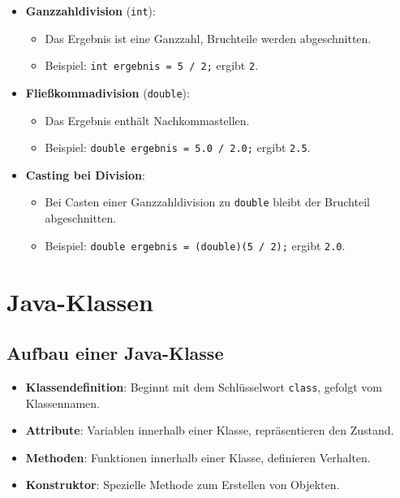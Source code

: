 \documentclass[a4paper,10pt, dvipsnames]{report}
\newcommand{\javaInLine}[1]{\texttt{#1}}
\begin{document}
\begin{itemize}
    \item \textbf{Ganzzahldivision} (\javaInLine{int}):
    \begin{itemize}
        \item Das Ergebnis ist eine Ganzzahl, Bruchteile werden abgeschnitten.
        \item Beispiel: \javaInLine{int ergebnis = 5 / 2;} ergibt \javaInLine{2}.
    \end{itemize}

    \item \textbf{Fließkommadivision} (\javaInLine{double}):
    \begin{itemize}
        \item Das Ergebnis enthält Nachkommastellen.
        \item Beispiel: \javaInLine{double ergebnis = 5.0 / 2.0;} ergibt \javaInLine{2.5}.
    \end{itemize}

    \item \textbf{Casting bei Division}:
    \begin{itemize}
        \item Bei Casten einer Ganzzahldivision zu \javaInLine{double} bleibt der Bruchteil abgeschnitten.
        \item Beispiel: \javaInLine{double ergebnis = (double)(5 / 2);} ergibt \javaInLine{2.0}.
    \end{itemize}
\end{itemize}




\section{Java-Klassen}

\subsection{Aufbau einer Java-Klasse}

\begin{itemize}
    \item \textbf{Klassendefinition}: Beginnt mit dem Schlüsselwort \javaInLine{class}, gefolgt vom Klassennamen.
    \item \textbf{Attribute}: Variablen innerhalb einer Klasse, repräsentieren den Zustand.
    \item \textbf{Methoden}: Funktionen innerhalb einer Klasse, definieren Verhalten.
    \item \textbf{Konstruktor}: Spezielle Methode zum Erstellen von Objekten.
\end{itemize}
\end{document}
